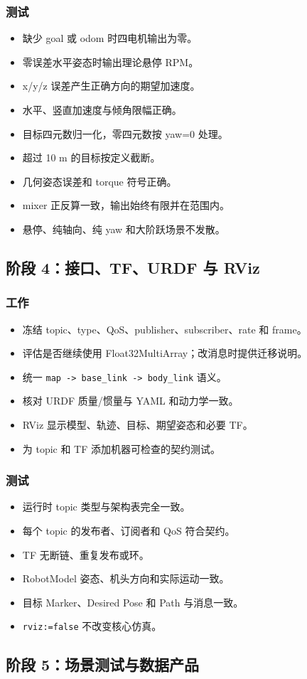 \documentclass[UTF8,a4paper,12pt,fontset=fandol]{ctexart}
\newcommand{\unchecked}{\(\square\)}
\newcommand{\workitem}[1]{\item[\unchecked] #1}
\newcommand{\code}[1]{\texttt{#1}}
\begin{document}
\subsubsection{测试}
\begin{itemize}
  \workitem{缺少 goal 或 odom 时四电机输出为零。}
  \workitem{零误差水平姿态时输出理论悬停 RPM。}
  \workitem{x/y/z 误差产生正确方向的期望加速度。}
  \workitem{水平、竖直加速度与倾角限幅正确。}
  \workitem{目标四元数归一化，零四元数按 yaw=0 处理。}
  \workitem{超过 10 m 的目标按定义截断。}
  \workitem{几何姿态误差和 torque 符号正确。}
  \workitem{mixer 正反算一致，输出始终有限并在范围内。}
  \workitem{悬停、纯轴向、纯 yaw 和大阶跃场景不发散。}
\end{itemize}

\subsection{阶段 4：接口、TF、URDF 与 RViz}

\subsubsection{工作}
\begin{itemize}
  \workitem{冻结 topic、type、QoS、publisher、subscriber、rate 和 frame。}
  \workitem{评估是否继续使用 Float32MultiArray；改消息时提供迁移说明。}
  \workitem{统一 \code{map -> base\_link -> body\_link} 语义。}
  \workitem{核对 URDF 质量/惯量与 YAML 和动力学一致。}
  \workitem{RViz 显示模型、轨迹、目标、期望姿态和必要 TF。}
  \workitem{为 topic 和 TF 添加机器可检查的契约测试。}
\end{itemize}

\subsubsection{测试}
\begin{itemize}
  \workitem{运行时 topic 类型与架构表完全一致。}
  \workitem{每个 topic 的发布者、订阅者和 QoS 符合契约。}
  \workitem{TF 无断链、重复发布或环。}
  \workitem{RobotModel 姿态、机头方向和实际运动一致。}
  \workitem{目标 Marker、Desired Pose 和 Path 与消息一致。}
  \workitem{\code{rviz:=false} 不改变核心仿真。}
\end{itemize}

\subsection{阶段 5：场景测试与数据产品}
\end{document}
